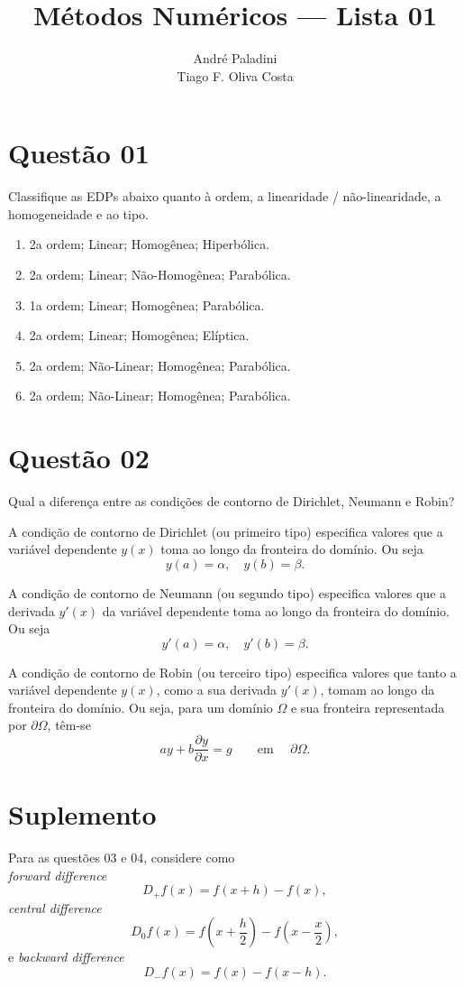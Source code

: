 \documentclass{article}
\title{Métodos Numéricos --- Lista 01}
\author{André Paladini  \quad 14182390 \\ Tiago F. Oliva Costa \quad 8004408 }
\begin{document}
\maketitle

\section{Questão 01}
Classifique as EDPs abaixo quanto à ordem, a linearidade / não-linearidade, a homogeneidade e ao tipo.

\begin{enumerate}[label=\Alph*]
\item 2a ordem; Linear; Homogênea; Hiperbólica.
\item 2a ordem; Linear; Não-Homogênea; Parabólica.
\item 1a ordem; Linear; Homogênea; Parabólica.
\item 2a ordem; Linear; Homogênea; Elíptica.
\item 2a ordem; Não-Linear; Homogênea; Parabólica.
\item 2a ordem; Não-Linear; Homogênea; Parabólica.
\end{enumerate}

\section{Questão 02}
Qual a diferença entre as condições de contorno de Dirichlet, Neumann e Robin?

A condição de contorno de Dirichlet (ou primeiro tipo) especifica valores que a variável dependente $y(x)$ toma ao longo da fronteira do domínio. Ou seja
\[ y(a) = \alpha, \quad y(b) = \beta. \]

A condição de contorno de Neumann (ou segundo tipo) especifica valores que a derivada $y'(x)$ da variável dependente  toma ao longo da fronteira do domínio. Ou seja
\[ y'(a) = \alpha, \quad y'(b) = \beta. \]

A condição de contorno de Robin (ou terceiro tipo) especifica valores que tanto a variável dependente $y(x)$, como a sua derivada $y'(x)$, tomam ao longo da fronteira do domínio. Ou seja, para um domínio $\Omega$ e sua fronteira representada por $\partial \Omega$, têm-se
\[ a y + b \frac{\partial y}{\partial x} =g \qquad \text{em } \quad \partial \Omega.\]

\section{Suplemento}
Para as questões 03 e 04, considere como\\
\emph{forward difference}
\[
	D_+ f(x) = f(x+h) - f(x),
\]
\emph{central difference}
\[
	D_0 f(x) = f(x+\frac{h}{2}) - f(x - \frac{x}{2}),
\]
e \emph{backward difference}
\[
	D_- f(x) = f(x) - f(x-h).
\]
\end{document}
